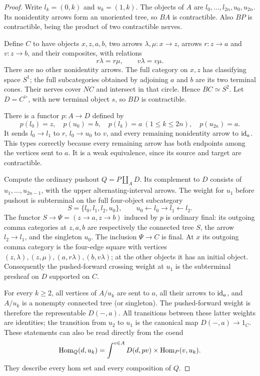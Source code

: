 \begin{proof}
Write $l_k=(0,k)$ and $u_k=(1,k)$. The objects of $A$ are
$l_0,\ldots,l_{2n},u_0,u_{2n}$. Its nonidentity arrows form
an unoriented tree, so $BA$ is contractible. Also $BP$ is
contractible, being the product of two contractible nerves.

Define $C$ to have objects $x,z,a,b$, two arrows
$\lambda,\mu:x\to z$, arrows $r:z\to a$ and $v:z\to b$,
and their composites, with relations
\[
 r\lambda=r\mu,\qquad v\lambda=v\mu.
\]
There are no other nonidentity arrows. The full category on
$x,z$ has classifying space $S^1$; the full subcategories
obtained by adjoining $a$ and $b$ are its two terminal cones.
Their nerves cover $NC$ and intersect in that circle. Hence
$BC\simeq S^2$. Let $D=C^{\triangleright}$, with new terminal
object $s$, so $BD$ is contractible.

There is a functor $p:A\to D$ defined by
\[
 p(l_0)=z,\quad p(u_0)=b,\quad
 p(l_k)=a\ (1\leq k\leq2n),\quad p(u_{2n})=a.
\]
It sends $l_0\to l_1$ to $r$, $l_0\to u_0$ to $v$, and
every remaining nonidentity arrow to $\mathrm{id}_a$. This types
correctly because every remaining arrow has both endpoints
among the vertices sent to $a$. It is a weak equivalence,
since its source and target are contractible.

Compute the ordinary pushout $Q=P\amalg_A D$. Its complement
to $D$ consists of $u_1,\ldots,u_{2n-1}$, with the upper
alternating-interval arrows. The weight for $u_1$ before
pushout is subterminal on the full four-object subcategory
\[
 S=\{l_0,l_1,l_2,u_0\},\qquad
 u_0\leftarrow l_0\to l_1\leftarrow l_2.
\]
The functor $S\to\Psi=(z\to a,z\to b)$ induced by $p$
is ordinary final: its outgoing comma categories at $z,a,b$
are respectively the connected tree $S$, the arrow
$l_2\to l_1$, and the singleton $u_0$. The inclusion
$\Psi\to C$ is final. At $x$ its outgoing comma category
is the four-edge square with vertices
$(z,\lambda),(z,\mu),(a,r\lambda),(b,v\lambda)$;
at the other objects it has an initial object. Consequently
the pushed-forward crossing weight at $u_1$ is the
subterminal presheaf on $D$ supported on $C$.

For every $k\geq2$, all vertices of $A/u_k$ are sent to
$a$, all their arrows to $\mathrm{id}_a$, and $A/u_k$ is a nonempty
connected tree (or singleton). The pushed-forward weight is
therefore the representable $D(-,a)$. All transitions between
these latter weights are identities; the transition from
$u_2$ to $u_1$ is the canonical map $D(-,a)\to1_C$.
These statements can also be read directly from the coend
\[
 \operatorname{Hom}_Q(d,u_k)=\int^{v\in A}
       D(d,pv)\times\operatorname{Hom}_P(v,u_k).
\]
They describe every hom set and every composition of $Q$.


\end{proof}
